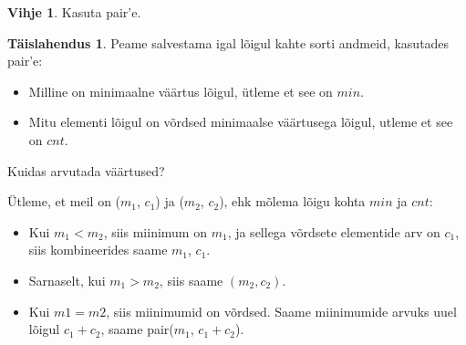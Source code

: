 \documentclass{trkut}
\theoremstyle{definition}
\newtheorem*{vihje}{Vihje}
\newtheorem*{solution}{Täislahendus}
\begin{document}
\begin{vihje}
Kasuta pair'e.
\end{vihje}

\begin{solution}
Peame salvestama igal lõigul kahte sorti andmeid, kasutades pair'e:
\begin{itemize}
\item Milline on minimaalne väärtus lõigul, ütleme et see on $min$.
\item Mitu elementi lõigul on võrdsed minimaalse väärtusega lõigul, utleme et see on $cnt$.
\end{itemize}

Kuidas arvutada väärtused?

Ütleme, et meil on ($m_1$, $c_1$) ja ($m_2$, $c_2$), ehk mõlema lõigu kohta $min$ ja $cnt$:
\begin{itemize}
\item Kui $m_1<m_2$, siis miinimum on $m_1$, ja sellega võrdsete elementide arv on $c_1$, siis kombineerides saame $m_1$, $c_1$. 
\item Sarnaselt, kui $m_1>m_2$, siis saame $(m_2,c_2)$. 
\item Kui $m1=m2$, siis miinimumid on võrdsed. Saame miinimumide arvuks uuel lõigul $c_1+c_2$, saame pair($m_1$, $c_1+c_2$).
\end{itemize}
\end{solution}
\end{document}
